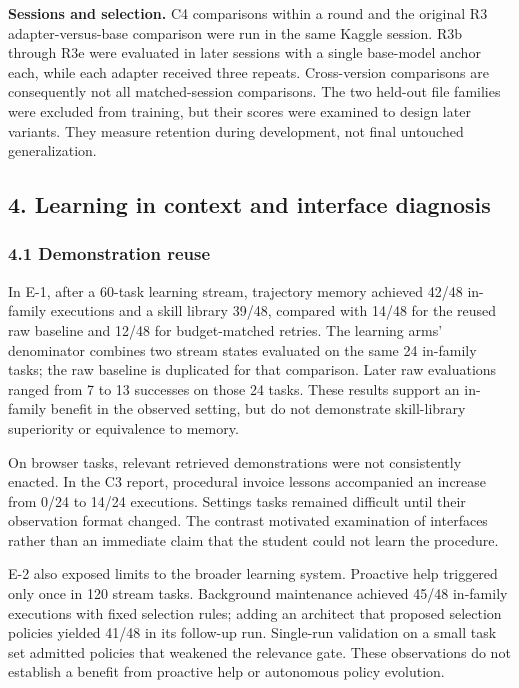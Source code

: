 \documentclass[
  10pt,
]{article}
\begin{document}
\textbf{Sessions and selection.} C4 comparisons within a round and the
original R3 adapter-versus-base comparison were run in the same Kaggle
session. R3b through R3e were evaluated in later sessions with a single
base-model anchor each, while each adapter received three repeats.
Cross-version comparisons are consequently not all matched-session
comparisons. The two held-out file families were excluded from training,
but their scores were examined to design later variants. They measure
retention during development, not final untouched generalization.

\subsection{4. Learning in context and interface
diagnosis}\label{learning-in-context-and-interface-diagnosis}

\subsubsection{4.1 Demonstration reuse}\label{demonstration-reuse}

In E-1, after a 60-task learning stream, trajectory memory achieved
42/48 in-family executions and a skill library 39/48, compared with
14/48 for the reused raw baseline and 12/48 for budget-matched retries.
The learning arms' denominator combines two stream states evaluated on
the same 24 in-family tasks; the raw baseline is duplicated for that
comparison. Later raw evaluations ranged from 7 to 13 successes on those
24 tasks. These results support an in-family benefit in the observed
setting, but do not demonstrate skill-library superiority or equivalence
to memory.

On browser tasks, relevant retrieved demonstrations were not
consistently enacted. In the C3 report, procedural invoice lessons
accompanied an increase from 0/24 to 14/24 executions. Settings tasks
remained difficult until their observation format changed. The contrast
motivated examination of interfaces rather than an immediate claim that
the student could not learn the procedure.

E-2 also exposed limits to the broader learning system. Proactive help
triggered only once in 120 stream tasks. Background maintenance achieved
45/48 in-family executions with fixed selection rules; adding an
architect that proposed selection policies yielded 41/48 in its
follow-up run. Single-run validation on a small task set admitted
policies that weakened the relevance gate. These observations do not
establish a benefit from proactive help or autonomous policy evolution.
\end{document}

